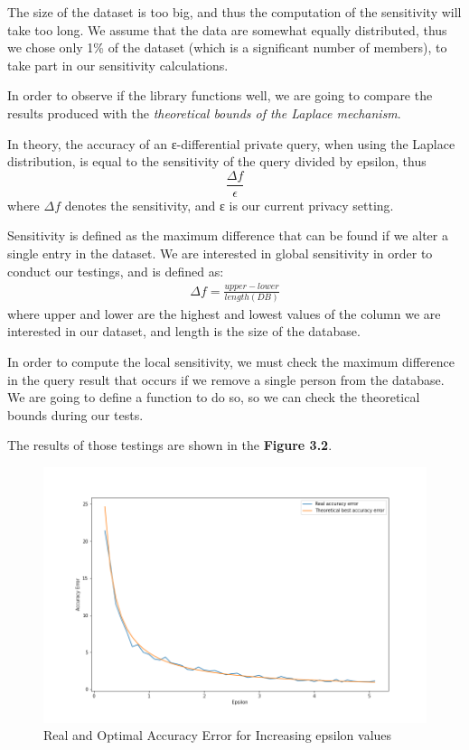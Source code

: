 The size of the dataset is too big, and thus the computation of the sensitivity will take too long. We assume that the data are somewhat equally distributed, thus we chose only 1\% of the dataset (which is a significant number of members), to take part in our sensitivity calculations.

In order to observe if the library functions well, we are going to compare the results produced with the \emph{theoretical bounds of the Laplace mechanism}. 

In theory, the accuracy of an ε-differential private query, when using the Laplace distribution, is equal to the sensitivity of the query divided by epsilon, thus $$\frac{\Delta f}{\epsilon}$$ where $\Delta f$ denotes the sensitivity, and ε is our current privacy setting. 

Sensitivity is defined as the maximum difference that can be found if we alter a single entry in the dataset. We are interested in global sensitivity in order to conduct our testings, and is defined as:
    \begin{align*}
        \Delta f = \frac{upper - lower}{length(DB)}
    \end{align*} where upper and lower are the highest and lowest values of the column we are interested in our dataset, and length is the size of the database.
    
    
In order to compute the local sensitivity, we must check the maximum difference in the query result that occurs if we remove a single person from the database. We are going to define a function to do so, so we can check the theoretical bounds during our tests.

The results of those testings are shown in the \textbf{Figure 3.2}.

\begin{figure}[!htb]\centering
    \includegraphics[width=1\textwidth]{images/epsilon_measurements.png}
    \caption{Real and Optimal Accuracy Error for Increasing epsilon values}
\end{figure}

